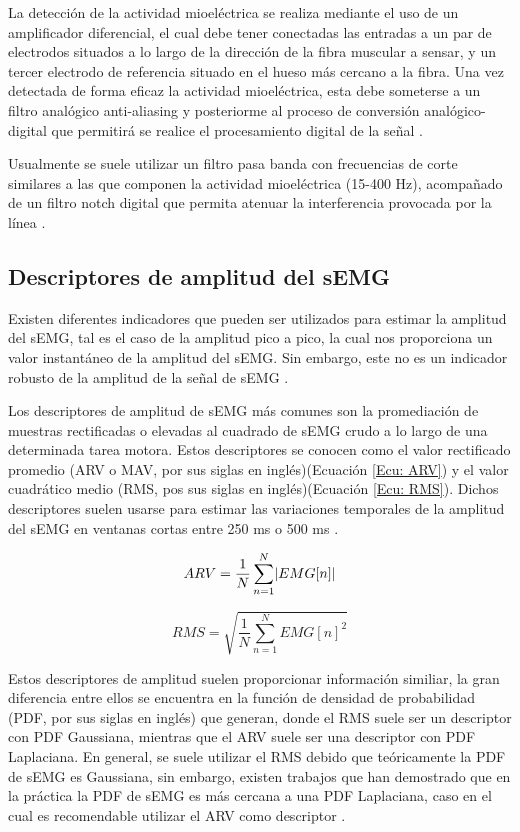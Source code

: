 La detección de la actividad mioeléctrica se realiza mediante el uso de un amplificador diferencial, el cual debe tener conectadas las entradas a un par de electrodos situados a lo largo de la dirección de la fibra muscular a sensar, y un tercer electrodo de referencia situado en el hueso más cercano a la fibra. Una vez detectada de forma eficaz la actividad mioeléctrica, esta debe someterse a un filtro analógico anti-aliasing y posteriorme al proceso de conversión analógico-digital que permitirá se realice el procesamiento digital de la señal \cite{Cavalcanti-Garcia2009}.

Usualmente se suele utilizar un filtro pasa banda con frecuencias de corte similares a las que componen la actividad mioeléctrica (15-400 Hz), acompañado de un filtro notch digital que permita atenuar la interferencia provocada por la línea \cite{Cavalcanti-Garcia2009}.

\subsection{Descriptores de amplitud del sEMG}
Existen diferentes indicadores que pueden ser utilizados para estimar la amplitud del sEMG, tal es el caso de la amplitud pico a pico, la cual nos proporciona un valor instantáneo de la amplitud del sEMG. Sin embargo, este no es un indicador robusto de la amplitud de la señal de sEMG \cite{Cavalcanti-Garcia2009}.

Los descriptores de amplitud de sEMG más comunes son la promediación de muestras rectificadas o elevadas al cuadrado de sEMG crudo a lo largo de una determinada tarea motora. Estos descriptores se conocen como el valor rectificado promedio (ARV o MAV, por sus siglas en inglés)(Ecuación \ref{Ecu: ARV}) y el valor cuadrático medio (RMS, pos sus siglas en inglés)(Ecuación \ref{Ecu: RMS}). Dichos descriptores suelen usarse para estimar las variaciones temporales de la amplitud del sEMG en ventanas cortas entre 250 ms o 500 ms \cite{Cavalcanti-Garcia2009}.

\begin{equation}
	ARV = \frac{1}{N} \sum_{n=1}^{N} \lvert EMG[n]\rvert
	\label{Ecu: ARV}
\end{equation}

\begin{equation}
	RMS = \sqrt{\frac{1}{N} \sum_{n=1}^{N} EMG[n]^{2}}
	\label{Ecu: RMS}
\end{equation}

Estos descriptores de amplitud suelen proporcionar información similiar, la gran diferencia entre ellos se encuentra en la función de densidad de probabilidad (PDF, por sus siglas en inglés) que generan, donde el RMS suele ser un descriptor con PDF Gaussiana, mientras que el ARV suele ser una descriptor con PDF Laplaciana. En general, se suele utilizar el RMS debido que teóricamente la PDF de sEMG es Gaussiana, sin embargo, existen trabajos que han demostrado que en la práctica la PDF de sEMG es más cercana a una PDF Laplaciana, caso en el cual es recomendable utilizar el ARV como descriptor \cite{Clancy1999}\cite{Phinyomark2013}.
